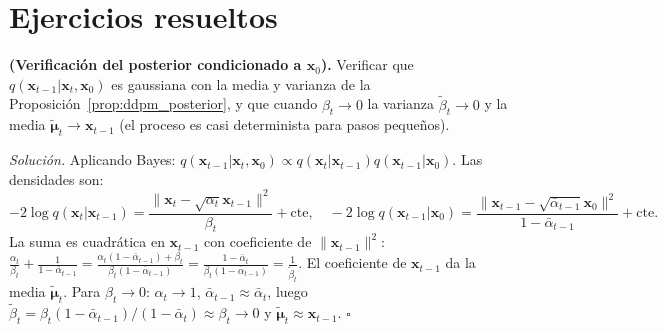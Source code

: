 \section*{Ejercicios resueltos}

\begin{ejercicio}
\label{ej:ddpm_posterior}
\textbf{(Verificación del posterior condicionado a $\bm{x}_0$).}
Verificar que $q(\bm{x}_{t-1}|\bm{x}_t,\bm{x}_0)$ es gaussiana con la media
y varianza de la Proposición~\ref{prop:ddpm_posterior}, y que cuando $\beta_t\to 0$
la varianza $\tilde{\beta}_t\to 0$ y la media $\tilde{\bm{\mu}}_t\to\bm{x}_{t-1}$
(el proceso es casi determinista para pasos pequeños).

\medskip\noindent\textit{Solución.}
Aplicando Bayes: $q(\bm{x}_{t-1}|\bm{x}_t,\bm{x}_0)\propto q(\bm{x}_t|\bm{x}_{t-1})
q(\bm{x}_{t-1}|\bm{x}_0)$. Las densidades son:
\[
  -2\log q(\bm{x}_t|\bm{x}_{t-1})
  = \frac{\|\bm{x}_t-\sqrt{\alpha_t}\bm{x}_{t-1}\|^2}{\beta_t} + \text{cte},
  \quad
  -2\log q(\bm{x}_{t-1}|\bm{x}_0)
  = \frac{\|\bm{x}_{t-1}-\sqrt{\bar{\alpha}_{t-1}}\bm{x}_0\|^2}
    {1-\bar{\alpha}_{t-1}} + \text{cte}.
\]
La suma es cuadrática en $\bm{x}_{t-1}$ con coeficiente de $\|\bm{x}_{t-1}\|^2$:
$\frac{\alpha_t}{\beta_t} + \frac{1}{1-\bar{\alpha}_{t-1}} = \frac{\alpha_t(1-\bar{\alpha}_{t-1})
+\beta_t}{\beta_t(1-\bar{\alpha}_{t-1})} = \frac{1-\bar{\alpha}_t}{\beta_t(1-\bar{\alpha}_{t-1})}
= \frac{1}{\tilde{\beta}_t}$.
El coeficiente de $\bm{x}_{t-1}$ da la media $\tilde{\bm{\mu}}_t$.
Para $\beta_t\to 0$: $\alpha_t\to 1$, $\bar{\alpha}_{t-1}\approx\bar{\alpha}_t$,
luego $\tilde{\beta}_t = \beta_t(1-\bar{\alpha}_{t-1})/(1-\bar{\alpha}_t)\approx\beta_t\to 0$
y $\tilde{\bm{\mu}}_t \approx \bm{x}_{t-1}$. $\square$
\end{ejercicio}

